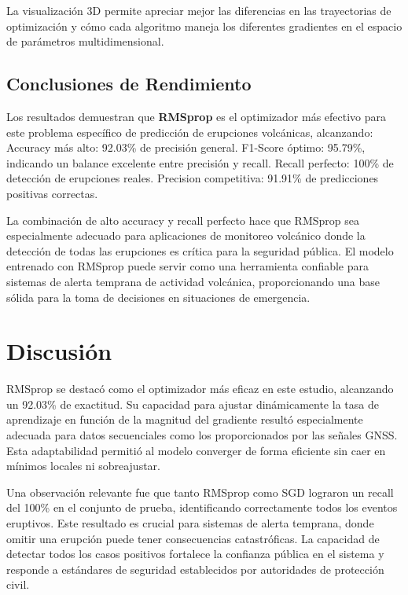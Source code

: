 \documentclass[conference]{IEEEtran}
\begin{document}
La visualización 3D permite apreciar mejor las diferencias en las trayectorias de optimización y cómo cada algoritmo maneja los diferentes gradientes en el espacio de parámetros multidimensional.

\subsection{Conclusiones de Rendimiento}

Los resultados demuestran que \textbf{RMSprop} es el optimizador más efectivo para este problema específico de predicción de erupciones volcánicas, alcanzando:
Accuracy más alto: 92.03\% de precisión general. F1-Score óptimo: 95.79\%, indicando un balance excelente entre precisión y recall. Recall perfecto: 100\% de detección de erupciones reales. Precision competitiva: 91.91\% de predicciones positivas correctas.

La combinación de alto accuracy y recall perfecto hace que RMSprop sea especialmente adecuado para aplicaciones de monitoreo volcánico donde la detección de todas las erupciones es crítica para la seguridad pública. El modelo entrenado con RMSprop puede servir como una herramienta confiable para sistemas de alerta temprana de actividad volcánica, proporcionando una base sólida para la toma de decisiones en situaciones de emergencia. 

\section{Discusión}

RMSprop se destacó como el optimizador más eficaz en este estudio, alcanzando un 92.03\% de exactitud. Su capacidad para ajustar dinámicamente la tasa de aprendizaje en función de la magnitud del gradiente resultó especialmente adecuada para datos secuenciales como los proporcionados por las señales GNSS. Esta adaptabilidad permitió al modelo converger de forma eficiente sin caer en mínimos locales ni sobreajustar.

Una observación relevante fue que tanto RMSprop como SGD lograron un recall del 100\% en el conjunto de prueba, identificando correctamente todos los eventos eruptivos. Este resultado es crucial para sistemas de alerta temprana, donde omitir una erupción puede tener consecuencias catastróficas. La capacidad de detectar todos los casos positivos fortalece la confianza pública en el sistema y responde a estándares de seguridad establecidos por autoridades de protección civil.
\end{document}

